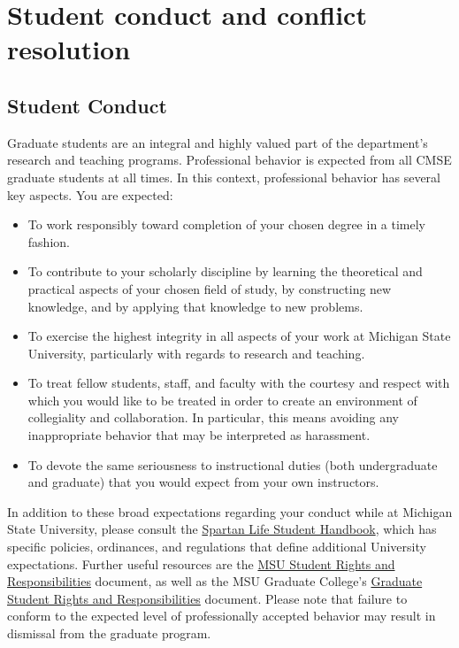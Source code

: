 \section{Student conduct and conflict resolution}

\subsection{Student Conduct}

Graduate students are an integral and highly valued part of the
department’s research and teaching programs.  Professional behavior is
expected from all CMSE graduate students at all times.  In this
context, professional behavior has several key aspects.  You are
expected:

\begin{itemize}

\item To work responsibly toward completion of your chosen degree in a
timely fashion.

\item To contribute to your scholarly discipline by learning the
theoretical and practical aspects of your chosen field of study, by
constructing new knowledge, and by applying that knowledge to new
problems.

\item To exercise the highest integrity in all aspects of your work at
Michigan State University, particularly with regards to research and
teaching.

\item To treat fellow students, staff, and faculty with the courtesy
and respect with which you would like to be treated in order to create
an environment of collegiality and collaboration.  In particular, this
means avoiding any inappropriate behavior that may be interpreted as
harassment.

\item To devote the same seriousness to instructional duties (both
undergraduate and graduate) that you would expect from your own
instructors.

\end{itemize}

\noindent
In addition to these broad expectations regarding your conduct while
at Michigan State University, please consult the
\href{http://splife.studentlife.msu.edu/}{Spartan Life Student
Handbook}, which has specific policies, ordinances, and regulations
that define additional University expectations.  Further useful
resources are the
\href{http://splife.studentlife.msu.edu/academic-freedom-for-students-at-michigan-state-university}{MSU
Student Rights and Responsibilities} document, as well as the MSU
Graduate College's \href{https://grad.msu.edu/gsrr}{Graduate Student
Rights and Responsibilities} document.  Please note that failure to
conform to the expected level of professionally accepted behavior may
result in dismissal from the graduate program.

